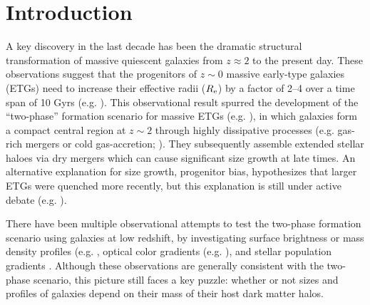 \documentclass[a4paper,fleqn,usenatbib]{mnras}
\begin{document}
\section{Introduction}
    \label{sec:intro}
    
    A key discovery in the last 
    decade has been the dramatic structural transformation of massive quiescent 
    galaxies \citep[e.g.][]{Trujillo2006, vanDokkum2008, Cimatti2008, Damjanov2009, 
    vanderWel2011, Szomoru2012, Patel2013} from $z \approx 2$ to the present day. 
    These observations suggest that the progenitors of $z{\sim} 0$ massive early-type 
    galaxies (ETGs) need to increase their effective radii ($R_{\rm e}$) by a factor 
    of 2--4 over a time span of 10 Gyrs (e.g. \citealt{Newman2012, vdWel2014}). 
    This observational result spurred the development of the ``two-phase'' formation
    scenario for massive ETGs (e.g. \citealt{Oser2010, Oser2012}),
    in which galaxies form a compact central region at $z\sim 2$ through highly 
    dissipative processes (e.g. gas-rich mergers or cold gas-accretion;
    \citealt{Hopkins2008, Dekel2009}). 
    They subsequently assemble extended stellar haloes via dry mergers 
    \citep[e.g,][]{Naab2006, Khochfar2006, Oser2010, Oser2012} which can cause 
    significant size growth at late times. 
    An alternative explanation for size growth, progenitor bias, hypothesizes that 
    larger ETGs were quenched more recently, but this explanation is still under 
    active debate (e.g. \citealt{Newman2012, Carollo2013, Poggianti2013, Belli2015,
    Keating2015, Fagioli2016}). 
    
    There have been multiple observational attempts to test the two-phase 
    formation scenario using galaxies at low redshift, by investigating surface 
    brightness or mass density profiles (e.g. \citealt{Huang2013a, Huang2013b, 
    Oh2017}, optical color gradients (e.g. \citealt{LaBarbera2010, LaBarbera2012}), 
    and stellar population gradients \citep[e.g.,][]{Coccato2010, Coccato2011, 
    Greene2015, Barbosa2016}. 
    Although these observations are generally consistent with the two-phase scenario, 
    this picture still faces a key puzzle: whether or not sizes and profiles of galaxies 
    depend on their mass of their host dark matter halos.
 
\end{document}
